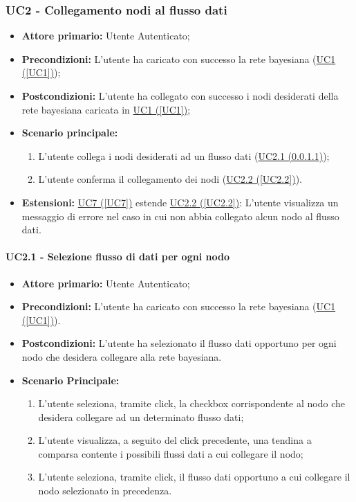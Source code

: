 \subsubsection{UC2 - Collegamento nodi al flusso dati}\label{UC2}
\begin{itemize}
\item \textbf{Attore primario:} Utente Autenticato;
\item \textbf{Precondizioni:} L'utente ha caricato con successo la rete bayesiana (\hyperref[UC1]{UC1 (\ref*{UC1})});
\item \textbf{Postcondizioni:} L'utente ha collegato con successo i nodi desiderati della rete bayesiana caricata in \hyperref[UC1]{UC1 (\ref*{UC1})};
\item \textbf{Scenario principale:}
	\begin{enumerate}
	\item L'utente collega i nodi desiderati ad un flusso dati (\hyperref[UC2.1]{UC2.1 (\ref*{UC2.1})});
	\item L'utente conferma il collegamento dei nodi (\hyperref[2.2]{UC2.2 (\ref*{UC2.2})}).
	\end{enumerate}
\item \textbf{Estensioni:} \hyperref[UC7]{UC7 (\ref*{UC7})} estende \hyperref[UC2.2]{UC2.2 (\ref*{UC2.2})}: L'utente visualizza un messaggio di errore nel caso in cui non abbia collegato alcun nodo al flusso dati.
\end{itemize}

\paragraph{UC2.1 - Selezione flusso di dati per ogni nodo}\label{UC2.1}
\begin{itemize}
\item \textbf{Attore primario:} Utente Autenticato;
\item \textbf{Precondizioni:} L'utente ha caricato con successo la rete bayesiana (\hyperref[UC1]{UC1 (\ref*{UC1})}).
\item \textbf{Postcondizioni:} L'utente ha selezionato il flusso dati opportuno per ogni nodo che desidera collegare alla rete bayesiana.
\item \textbf{Scenario Principale:}
 \begin{enumerate}
 \item L'utente seleziona, tramite click, la checkbox corrispondente al nodo che desidera collegare ad un determinato flusso dati;
 \item L'utente visualizza, a seguito del click precedente, una tendina a comparsa contente i possibili flussi dati a cui collegare il nodo;
 \item L'utente seleziona, tramite click, il flusso dati opportuno a cui collegare il nodo selezionato in precedenza.
 \end{enumerate}
\end{itemize}

